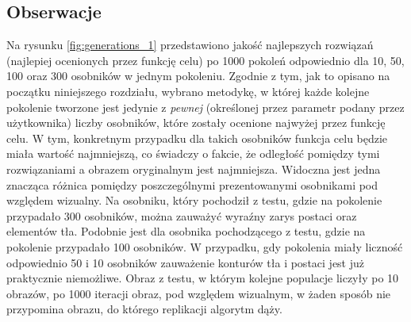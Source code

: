 \subsection{Obserwacje}
Na rysunku \ref{fig:generations_1} przedstawiono jakość najlepszych rozwiązań (najlepiej ocenionych przez funkcję celu) po 1000 pokoleń odpowiednio dla 10, 50, 100 oraz 300 osobników w jednym pokoleniu. Zgodnie z tym, jak to opisano na początku niniejszego rozdziału, wybrano metodykę, w której każde kolejne pokolenie tworzone jest jedynie z \textit{pewnej} (określonej przez parametr podany przez użytkownika) liczby osobników, które zostały ocenione najwyżej przez funkcję celu. W tym, konkretnym przypadku dla takich osobników funkcja celu będzie miała wartość najmniejszą, co świadczy o fakcie, że odległość pomiędzy tymi rozwiązaniami a obrazem oryginalnym jest najmniejsza. Widoczna jest jedna znacząca różnica pomiędzy poszczególnymi prezentowanymi osobnikami pod względem wizualny. Na osobniku, który pochodził z testu, gdzie na pokolenie przypadało 300 osobników, można zauważyć wyraźny zarys postaci oraz elementów tła. Podobnie jest dla osobnika pochodzącego z testu, gdzie na pokolenie przypadało 100 osobników. W przypadku, gdy pokolenia miały liczność odpowiednio 50 i 10 osobników zauważenie konturów tła i postaci jest już praktycznie niemożliwe. Obraz z testu, w którym kolejne populacje liczyły po 10 obrazów, po 1000 iteracji obraz, pod względem wizualnym, w żaden sposób nie przypomina obrazu, do którego replikacji algorytm dąży. 

